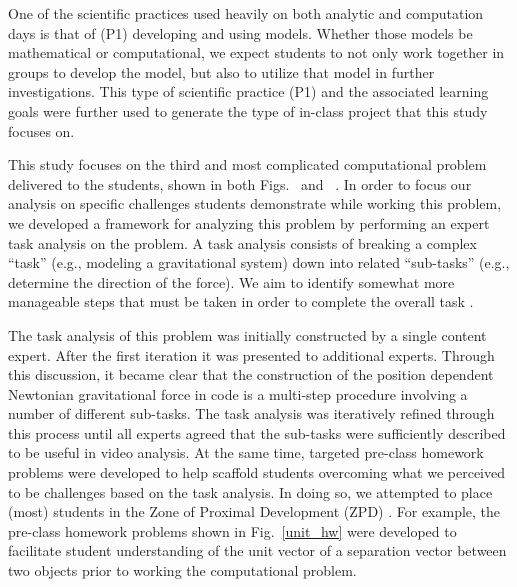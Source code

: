 \documentclass{msuphddissertation}
\begin{document}
\begin{doublespace}
One of the scientific practices used heavily on both analytic and computation days is that of (P1) developing and using models.  Whether those models be mathematical or computational, we expect students to not only work together in groups to develop the model, but also to utilize that model in further investigations.  This type of scientific practice (P1) and the associated learning goals\cite{Irving2017} were further used to generate the type of in-class project that this study focuses on.

This study focuses on the third and most complicated computational problem delivered to the students, shown in both Figs.~ and ~. In order to focus our analysis on specific challenges students demonstrate while working this problem, we developed a framework for analyzing this problem by performing an expert task analysis on the problem.  A task analysis consists of breaking a complex ``task'' (e.g., modeling a gravitational system) down into related ``sub-tasks'' (e.g., determine the direction of the force). We aim to identify somewhat more manageable steps that must be taken in order to complete the overall task \cite{catra}.

The task analysis of this problem was initially constructed by a single content expert. After the first iteration it was presented to additional experts. Through this discussion, it became clear that the construction of the position dependent Newtonian gravitational force in code is a multi-step procedure involving a number of different sub-tasks. The task analysis was iteratively refined through this process until all experts agreed that the sub-tasks were sufficiently described to be useful in video analysis. At the same time, targeted pre-class homework problems were developed to help scaffold students overcoming what we perceived to be challenges based on the task analysis.  In doing so, we attempted to place (most) students in the Zone of Proximal Development (ZPD) \cite{vyg}. For example, the pre-class homework problems shown in Fig.~\ref{unit_hw} were developed to facilitate student understanding of the unit vector of a separation vector between two objects prior to working the computational problem.


\end{doublespace}
\end{document}
